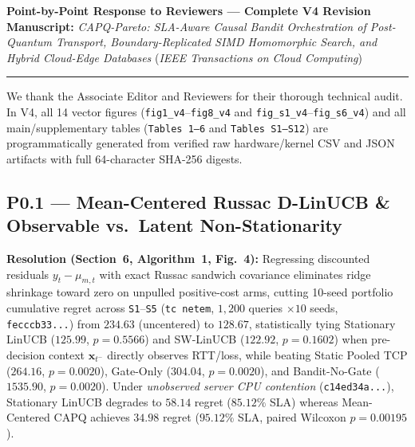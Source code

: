 \documentclass[10pt]{article}
\begin{document}
\begin{center}
{\Large \textbf{Point-by-Point Response to Reviewers --- Complete V4 Revision}}\\[0.25em]
{\normalsize \textbf{Manuscript:} \emph{CAPQ-Pareto: SLA-Aware Causal Bandit Orchestration of Post-Quantum Transport, Boundary-Replicated SIMD Homomorphic Search, and Hybrid Cloud-Edge Databases} (\emph{IEEE Transactions on Cloud Computing})}
\end{center}
\hrule
\vspace{0.5em}

We thank the Associate Editor and Reviewers for their thorough technical audit. In V4, all 14 vector figures (\texttt{fig1\_v4}--\texttt{fig8\_v4} and \texttt{fig\_s1\_v4}--\texttt{fig\_s6\_v4}) and all main/supplementary tables (\texttt{Tables 1--6} and \texttt{Tables S1--S12}) are programmatically generated from verified raw hardware/kernel CSV and JSON artifacts with full 64-character SHA-256 digests.

\subsection*{P0.1 --- Mean-Centered Russac D-LinUCB \& Observable vs.\ Latent Non-Stationarity}
\textbf{Resolution (Section~6, Algorithm~1, Fig.~4):} Regressing discounted residuals $y_t - \mu_{m,t}$ with exact Russac sandwich covariance eliminates ridge shrinkage toward zero on unpulled positive-cost arms, cutting 10-seed portfolio cumulative regret across \texttt{S1}--\texttt{S5} (\texttt{tc netem}, $1{,}200$ queries $\times 10$ seeds, \texttt{fecccb33...}) from $234.63$ (uncentered) to $\mathbf{128.67}$, statistically tying Stationary LinUCB ($125.99$, $p=0.5566$) and SW-LinUCB ($122.92$, $p=0.1602$) when pre-decision context $\mathbf{x}_{t^-}$ directly observes RTT/loss, while beating Static Pooled TCP ($264.16$, $p=0.0020$), Gate-Only ($304.04$, $p=0.0020$), and Bandit-No-Gate ($1535.90$, $p=0.0020$). Under \emph{unobserved server CPU contention} (\texttt{c14ed34a...}), Stationary LinUCB degrades to $58.14$ regret ($85.12\%$ SLA) whereas Mean-Centered CAPQ achieves $\mathbf{34.98}$ regret ($\mathbf{95.12\%}$ SLA, paired Wilcoxon $p=0.00195$).
\end{document}
